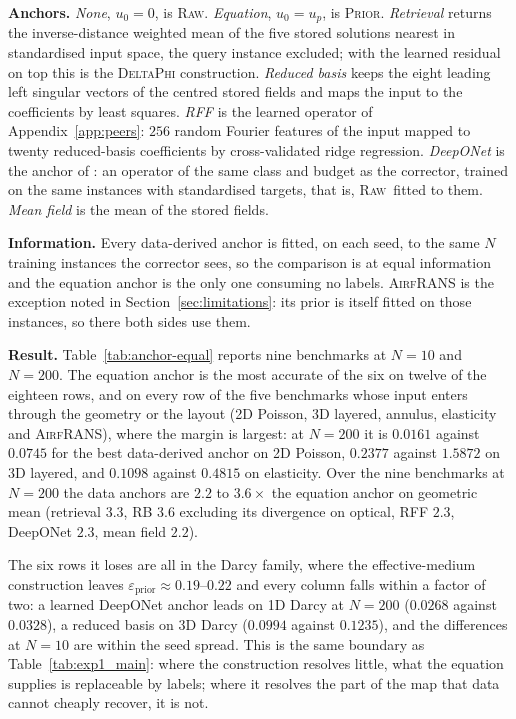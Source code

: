 \documentclass{article}
\newcommand{\armraw}{\textsc{Raw}}
\newcommand{\armprior}{\textsc{Prior}}
\begin{document}
\textbf{Anchors.} \emph{None}, $u_0=0$, is \armraw. \emph{Equation}, $u_0=u_p$,
is \armprior. \emph{Retrieval} \citep{yue2025deltaphi} returns the inverse-distance
weighted mean of the five stored solutions nearest in standardised input space, the
query instance excluded; with the learned residual on top this is the \textsc{DeltaPhi}
construction. \emph{Reduced basis} \citep{sirovich1987turbulence} keeps the eight
leading left singular vectors of the centred stored fields and maps the input to the
coefficients by least squares. \emph{RFF} is the learned operator of
Appendix~\ref{app:peers}: $256$ random Fourier features of the input mapped to twenty
reduced-basis coefficients by cross-validated ridge regression. \emph{DeepONet} is the
anchor of \citet{ma2026physics}: an operator of the same class and budget as the
corrector, trained on the same instances with standardised targets, that is, \armraw\
fitted to them.  \emph{Mean field} is the mean of the stored fields.

\textbf{Information.} Every data-derived anchor is fitted, on each seed, to the same $N$
training instances the corrector sees, so the comparison is at equal information and the equation
anchor is the only one consuming no labels. \textsc{AirfRANS} is the exception noted in
Section~\ref{sec:limitations}: its prior is itself fitted on those instances, so there both sides
use them.

\textbf{Result.} Table~\ref{tab:anchor-equal} reports nine benchmarks at $N=10$ and $N=200$. The
equation anchor is the most accurate of the six on twelve of the eighteen rows, and on every row
of the five benchmarks whose input enters through the geometry or the layout (2D Poisson, 3D
layered, annulus, elasticity and \textsc{AirfRANS}), where the margin is largest: at $N=200$ it
is $0.0161$ against $0.0745$ for the best data-derived anchor on 2D Poisson, $0.2377$ against
$1.5872$ on 3D layered, and $0.1098$ against $0.4815$ on elasticity. Over the nine benchmarks at
$N=200$ the data anchors are $2.2$ to $3.6\times$ the equation anchor on geometric mean
(retrieval $3.3$, RB $3.6$ excluding its divergence on optical, RFF $2.3$, DeepONet $2.3$, mean
field $2.2$).

The six rows it loses are all in the Darcy family, where the effective-medium construction
leaves $\varepsilon_{\mathrm{prior}}\approx0.19$--$0.22$ and every column falls within a factor of
two: a learned DeepONet anchor leads on 1D Darcy at $N=200$ ($0.0268$ against $0.0328$), a reduced
basis on 3D Darcy ($0.0994$ against $0.1235$), and the differences at $N=10$ are within the seed
spread. This is the same boundary as Table~\ref{tab:exp1_main}: where the construction resolves
little, what the equation supplies is replaceable by labels; where it resolves the part of the map
that data cannot cheaply recover, it is not.
\end{document}
